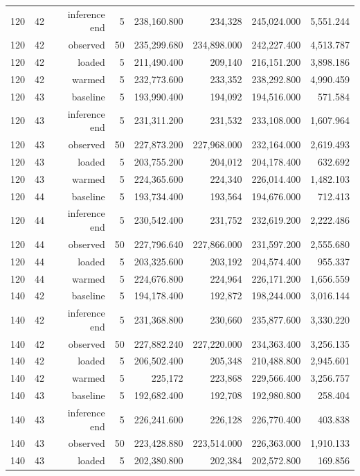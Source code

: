 \documentclass[10pt,a4paper]{article}
\begin{document}
\begin{longtable}{@{}lrrrrrrr@{}}
120 & 42 & inference end & 5 & 238,160.800 & 234,328 & 245,024.000 & 5,551.244 \\
120 & 42 & observed & 50 & 235,299.680 & 234,898.000 & 242,227.400 & 4,513.787 \\
120 & 42 & loaded & 5 & 211,490.400 & 209,140 & 216,151.200 & 3,898.186 \\
120 & 42 & warmed & 5 & 232,773.600 & 233,352 & 238,292.800 & 4,990.459 \\
120 & 43 & baseline & 5 & 193,990.400 & 194,092 & 194,516.000 & 571.584 \\
120 & 43 & inference end & 5 & 231,311.200 & 231,532 & 233,108.000 & 1,607.964 \\
120 & 43 & observed & 50 & 227,873.200 & 227,968.000 & 232,164.000 & 2,619.493 \\
120 & 43 & loaded & 5 & 203,755.200 & 204,012 & 204,178.400 & 632.692 \\
120 & 43 & warmed & 5 & 224,365.600 & 224,340 & 226,014.400 & 1,482.103 \\
120 & 44 & baseline & 5 & 193,734.400 & 193,564 & 194,676.000 & 712.413 \\
120 & 44 & inference end & 5 & 230,542.400 & 231,752 & 232,619.200 & 2,222.486 \\
120 & 44 & observed & 50 & 227,796.640 & 227,866.000 & 231,597.200 & 2,555.680 \\
120 & 44 & loaded & 5 & 203,325.600 & 203,192 & 204,574.400 & 955.337 \\
120 & 44 & warmed & 5 & 224,676.800 & 224,964 & 226,171.200 & 1,656.559 \\
140 & 42 & baseline & 5 & 194,178.400 & 192,872 & 198,244.000 & 3,016.144 \\
140 & 42 & inference end & 5 & 231,368.800 & 230,660 & 235,877.600 & 3,330.220 \\
140 & 42 & observed & 50 & 227,882.240 & 227,220.000 & 234,363.400 & 3,256.135 \\
140 & 42 & loaded & 5 & 206,502.400 & 205,348 & 210,488.800 & 2,945.601 \\
140 & 42 & warmed & 5 & 225,172 & 223,868 & 229,566.400 & 3,256.757 \\
140 & 43 & baseline & 5 & 192,682.400 & 192,708 & 192,980.800 & 258.404 \\
140 & 43 & inference end & 5 & 226,241.600 & 226,128 & 226,770.400 & 403.838 \\
140 & 43 & observed & 50 & 223,428.880 & 223,514.000 & 226,363.000 & 1,910.133 \\
140 & 43 & loaded & 5 & 202,380.800 & 202,384 & 202,572.800 & 169.856 \\

\end{longtable}
\end{document}
